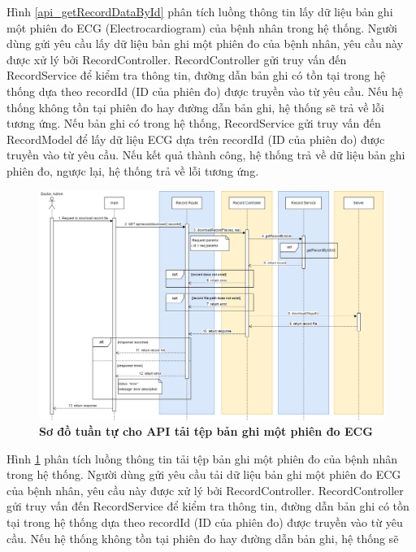 Hình \ref{api_getRecordDataById} phân tích luồng thông tin lấy dữ liệu bản ghi một phiên đo ECG (Electrocardiogram) của bệnh nhân trong hệ thống. Người dùng gửi yêu cầu lấy dữ liệu bản ghi một phiên đo của bệnh nhân, 
yêu cầu này được xử lý bởi RecordController. RecordController gửi truy vấn đến RecordService để kiểm tra thông tin, đường dẫn bản ghi có tồn tại trong hệ thống dựa theo recordId (ID của phiên đo) được truyền vào từ yêu cầu. Nếu hệ thống không tồn tại phiên đo hay đường dẫn bản ghi, hệ thống sẽ
trả về lỗi tương ứng. Nếu bản ghi có trong hệ thống, RecordService gửi truy vấn đến RecordModel để lấy dữ liệu ECG dựa trên recordId (ID của phiên đo) được truyền vào từ yêu cầu. 
Nếu kết quả thành công, hệ thống trả về dữ liệu bản ghi phiên đo, ngược lại, hệ thống trả về lỗi tương ứng.

 \begin{figure}[H]
  \centering
  \includegraphics[scale=0.38]{Images/sequence_api/downloadRecordDataById.png}
  \caption[Sơ đồ tuần tự cho API tải tệp bản ghi một phiên đo ECG ]{\bfseries \fontsize{12pt}{0pt}
  \selectfont Sơ đồ tuần tự cho API tải tệp bản ghi một phiên đo ECG }
  \label{api_downloadRecordDataById} %
\end{figure}
Hình \ref{api_downloadRecordDataById} phân tích luồng thông tin tải tệp bản ghi một phiên đo của bệnh nhân trong hệ thống. Người dùng gửi yêu cầu tải dữ liệu bản ghi một phiên đo ECG của bệnh nhân, 
yêu cầu này được xử lý bởi RecordController. RecordController gửi truy vấn đến RecordService để kiểm tra thông tin, đường dẫn bản ghi có tồn tại trong hệ thống dựa theo recordId (ID của phiên đo) được truyền vào từ yêu cầu. Nếu hệ thống không tồn tại phiên đo hay đường dẫn bản ghi, hệ thống sẽ
